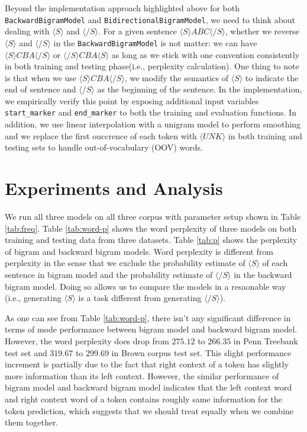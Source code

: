 \documentclass[11pt,a4paper]{article}
\begin{document}
Beyond the implementation approach highlighted above for both \texttt{BackwardBigramModel} and \texttt{BidirectionalBigramModel},
we need to think about dealing with $\langle S \rangle$ and $\langle /S \rangle$. For a given sentence 
$\langle S \rangle A B C \langle /S \rangle$, whether
we reverse $\langle S \rangle$ and $\langle /S \rangle$ in the \texttt{BackwardBigramModel} is not matter: we
can have $\langle S \rangle C B A \langle /S \rangle$ or $\langle /S \rangle C B A \langle S \rangle$ as long as we stick with
one convention consistently in both training and testing phase(i.e., perplexity calculation).
One thing to note is that when we use $\langle S \rangle C B A \langle /S \rangle$, we modify the semantics of $\langle S \rangle$
to indicate the end of sentence and $\langle /S \rangle$ as the beginning of the sentence. In the implementation,
we empirically verify this point by exposing additional input variables \texttt{start\_marker} and \texttt{end\_marker}
to both the training and evaluation functions. In addition, we use linear interpolation with a unigram model to perform smoothing and we replace
the first ouccrence of each token with $\langle UNK \rangle$ in both training and testing sets to handle out-of-vocabulary
(OOV) words.

\section{Experiments and Analysis}

We run all three models on all three corpus with parameter setup shown in Table \ref{tab:freq}.
Table \ref{tab:word-p} shows the word perplexity of three models on both training and testing data from
three datasets. Table \ref{tab:p} shows the perplexity of bigram and backward bigram models. Word perplexity
is different from perplexity in the sense that we exclude the probability estimate of $\langle S \rangle$
of each sentence in bigram model and the probability estimate of $\langle /S \rangle$ in the backward bigram
model. Doing so allows us to compare the models in a resaonable way (i.e., generating $\langle S \rangle$
is a task different from generating $\langle /S \rangle$).

As one can see from Table \ref{tab:word-p}, there isn't any significant difference in terms of mode performance
between bigram model and backward bigram model. However, the word perplexity does drop from
$275.12$ to $266.35$ in Penn Treebank test set and $319.67$ to $299.69$ in Brown corpus test set. This slight performance increment
is partially due to the fact that right context of a token has slightly more information than its left context. However,
the similar performance of bigram model and backward bigram model indicates that the left context word and right context
word of a token contains roughly same information for the token prediction, which suggests that we should treat 
equally when we combine them together.
\end{document}
